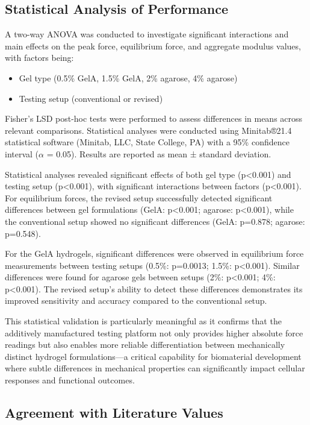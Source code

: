 \subsection{Statistical Analysis of Performance}

A two-way ANOVA was conducted to investigate significant interactions and main effects on the peak force, equilibrium force, and aggregate modulus values, with factors being:
\begin{itemize}
    \item Gel type (0.5\% GelA, 1.5\% GelA, 2\% agarose, 4\% agarose)
    \item Testing setup (conventional or revised)
\end{itemize}

Fisher's LSD post-hoc tests were performed to assess differences in means across relevant comparisons. Statistical analyses were conducted using Minitab®21.4 statistical software (Minitab, LLC, State College, PA) with a 95\% confidence interval ($\alpha$ = 0.05). Results are reported as mean ± standard deviation.

Statistical analyses revealed significant effects of both gel type (p<0.001) and testing setup (p<0.001), with significant interactions between factors (p<0.001). For equilibrium forces, the revised setup successfully detected significant differences between gel formulations (GelA: p<0.001; agarose: p<0.001), while the conventional setup showed no significant differences (GelA: p=0.878; agarose: p=0.548).

For the GelA hydrogels, significant differences were observed in equilibrium force measurements between testing setups (0.5\%: p=0.0013; 1.5\%: p<0.001). Similar differences were found for agarose gels between setups (2\%: p<0.001; 4\%: p<0.001). The revised setup's ability to detect these differences demonstrates its improved sensitivity and accuracy compared to the conventional setup.

This statistical validation is particularly meaningful as it confirms that the additively manufactured testing platform not only provides higher absolute force readings but also enables more reliable differentiation between mechanically distinct hydrogel formulations—a critical capability for biomaterial development where subtle differences in mechanical properties can significantly impact cellular responses and functional outcomes.

\subsection{Agreement with Literature Values}

